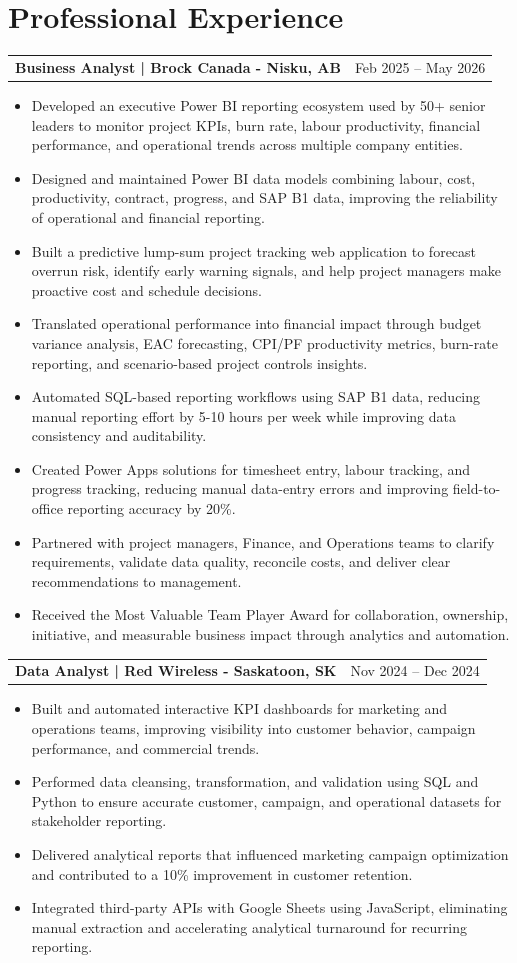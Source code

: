 \documentclass[10.5pt,letterpaper]{article}
\makeatletter
\newcommand{\resumeRow}[2]{%
  \noindent\begin{tabularx}{\linewidth}{@{}X r@{}}
    \textbf{#1} & #2 \\
  \end{tabularx}%
}
\makeatother
\begin{document}
\section{Professional Experience}
\resumeRow{Business Analyst | Brock Canada - Nisku, AB}{Feb 2025 -- May 2026}
\begin{itemize}
  \item Developed an executive Power BI reporting ecosystem used by 50+ senior leaders to monitor project KPIs, burn rate, labour productivity, financial performance, and operational trends across multiple company entities.
  \item Designed and maintained Power BI data models combining labour, cost, productivity, contract, progress, and SAP B1 data, improving the reliability of operational and financial reporting.
  \item Built a predictive lump-sum project tracking web application to forecast overrun risk, identify early warning signals, and help project managers make proactive cost and schedule decisions.
  \item Translated operational performance into financial impact through budget variance analysis, EAC forecasting, CPI/PF productivity metrics, burn-rate reporting, and scenario-based project controls insights.
  \item Automated SQL-based reporting workflows using SAP B1 data, reducing manual reporting effort by 5-10 hours per week while improving data consistency and auditability.
  \item Created Power Apps solutions for timesheet entry, labour tracking, and progress tracking, reducing manual data-entry errors and improving field-to-office reporting accuracy by 20\%.
  \item Partnered with project managers, Finance, and Operations teams to clarify requirements, validate data quality, reconcile costs, and deliver clear recommendations to management.
  \item Received the Most Valuable Team Player Award for collaboration, ownership, initiative, and measurable business impact through analytics and automation.
\end{itemize}
\resumeRow{Data Analyst | Red Wireless - Saskatoon, SK}{Nov 2024 -- Dec 2024}
\begin{itemize}
  \item Built and automated interactive KPI dashboards for marketing and operations teams, improving visibility into customer behavior, campaign performance, and commercial trends.
  \item Performed data cleansing, transformation, and validation using SQL and Python to ensure accurate customer, campaign, and operational datasets for stakeholder reporting.
  \item Delivered analytical reports that influenced marketing campaign optimization and contributed to a 10\% improvement in customer retention.
  \item Integrated third-party APIs with Google Sheets using JavaScript, eliminating manual extraction and accelerating analytical turnaround for recurring reporting.
\end{itemize}
\end{document}
